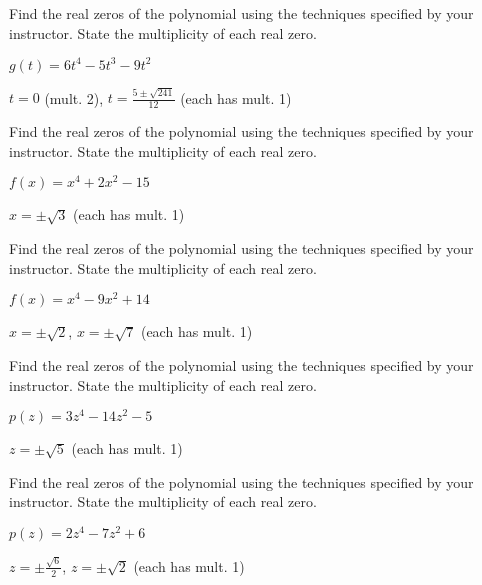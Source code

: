 \documentclass{ximera}
\begin{document}
\begin{problem}
Find the real zeros of the polynomial using the techniques specified by your instructor.  State the multiplicity of each real zero.

$g(t) = 6t^{4} - 5t^{3} - 9t^{2}$

\begin{solution}
$t = 0$ (mult. 2), $t = \frac{5 \pm \sqrt{241}}{12}$ (each has mult. 1)
\end{solution}

\end{problem}

\begin{problem}
Find the real zeros of the polynomial using the techniques specified by your instructor.  State the multiplicity of each real zero.

$f(x) = x^4+2x^2 - 15$

\begin{solution}
$x = \pm \sqrt{3}$ (each has mult. 1)
\end{solution}

\end{problem}

\begin{problem}
Find the real zeros of the polynomial using the techniques specified by your instructor.  State the multiplicity of each real zero.

$f(x) = x^4-9x^2+14$

\begin{solution}
$x = \pm \sqrt{2}$, $x = \pm \sqrt{7}$ (each has mult. 1) 
\end{solution}
\end{problem}

\begin{problem}
Find the real zeros of the polynomial using the techniques specified by your instructor.  State the multiplicity of each real zero.

$p(z) = 3z^4-14z^2-5$

\begin{solution}
$z = \pm \sqrt{5}$ (each has mult. 1) 
\end{solution}

\end{problem}

\begin{problem}
Find the real zeros of the polynomial using the techniques specified by your instructor.  State the multiplicity of each real zero.

$p(z) = 2z^4-7z^2+6$

\begin{solution}
$z = \pm \frac{\sqrt{6}}{2}$, $z = \pm \sqrt{2}$ (each has mult. 1)
\end{solution}

\end{problem}
\end{document}
